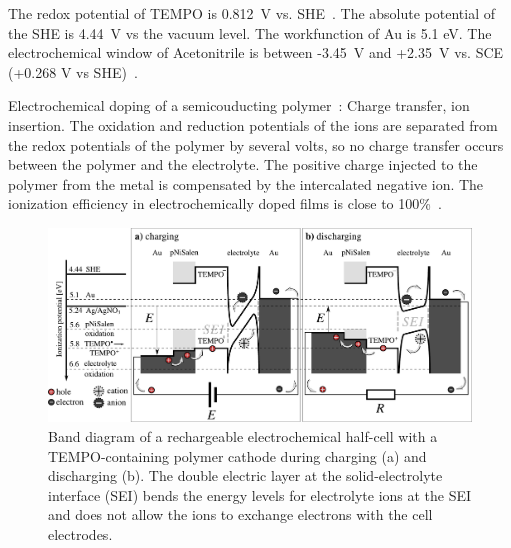 The redox potential of TEMPO is 0.812~V vs. SHE~\cite{Zhou2020}.
The absolute potential of the SHE is 4.44~V vs the vacuum level.
The workfunction of Au is 5.1 eV.
The electrochemical window of Acetonitrile is between -3.45~V and +2.35~V vs. SCE (+0.268 V vs SHE)~\cite{Luca2015}.

Electrochemical doping of a semicouducting polymer~\cite{Jacobs2022}:
Charge transfer, ion insertion.
The oxidation and reduction potentials of the ions are separated from the redox potentials of the polymer by several volts, so no charge transfer occurs between the polymer and the electrolyte. The positive charge injected to the polymer from the metal is compensated by the intercalated negative ion. The ionization efficiency in electrochemically doped films is close to 100\%~\cite{Jacobs2022}.\\

\begin{figure}[h]
\center
	\includegraphics[width=1\textwidth]{./electrochemistry/figures/band_diagram.pdf}
	\caption{Band diagram of a rechargeable electrochemical half-cell with a TEMPO-containing polymer cathode during charging (a) and discharging (b). The double electric layer at the solid-electrolyte interface (SEI) bends the energy levels for electrolyte ions at the SEI and does not allow the ions to exchange electrons with the cell electrodes.}
	\label{fig:band_diagram}
\end{figure}

